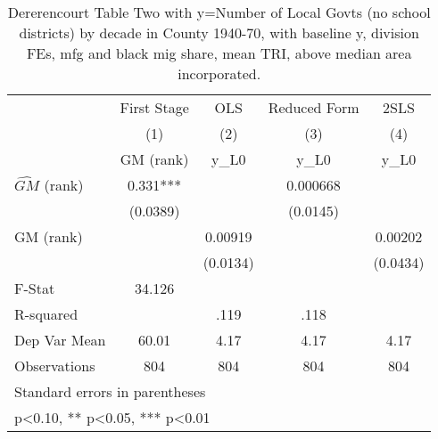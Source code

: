 \begin{table}[htbp]\centering
\def\sym#1{\ifmmode^{#1}\else\(^{#1}\)\fi}
\caption{Dererencourt Table Two with y=Number of Local Govts (no school districts) by decade in County 1940-70, with baseline y, division FEs, mfg and black mig share, mean TRI, above median area incorporated.}
\begin{tabular}{l*{4}{c}}
\toprule
                    & First Stage   &         OLS   &Reduced Form   &        2SLS   \\
                    &\multicolumn{1}{c}{(1)}&\multicolumn{1}{c}{(2)}&\multicolumn{1}{c}{(3)}&\multicolumn{1}{c}{(4)}\\
                    &\multicolumn{1}{c}{GM  (rank)}&\multicolumn{1}{c}{y\_L0}&\multicolumn{1}{c}{y\_L0}&\multicolumn{1}{c}{y\_L0}\\
\midrule
$\hat{GM}$ (rank)   &       0.331***&               &    0.000668   &               \\
                    &    (0.0389)   &               &    (0.0145)   &               \\
\addlinespace
GM  (rank)          &               &     0.00919   &               &     0.00202   \\
                    &               &    (0.0134)   &               &    (0.0434)   \\
\midrule
F-Stat              &      34.126   &               &               &               \\
R-squared           &               &        .119   &        .118   &               \\
Dep Var Mean        &       60.01   &        4.17   &        4.17   &        4.17   \\
Observations        &         804   &         804   &         804   &         804   \\
\bottomrule
\multicolumn{5}{l}{\footnotesize Standard errors in parentheses}\\
\multicolumn{5}{l}{\footnotesize * p<0.10, ** p<0.05, *** p<0.01}\\
\end{tabular}
\end{table}
